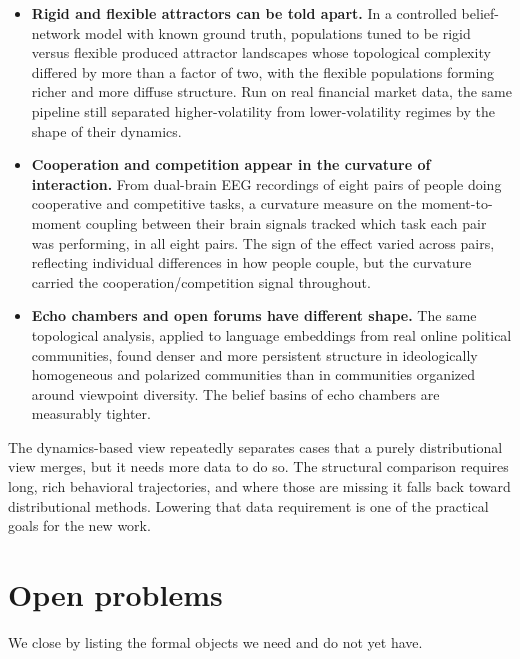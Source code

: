 \documentclass[11pt,a4paper]{article}
\begin{document}
\begin{itemize}[leftmargin=1.4em]
\item \textbf{Rigid and flexible attractors can be told apart.} In a controlled
belief-network model with known ground truth, populations tuned to be rigid
versus flexible produced attractor landscapes whose topological complexity
differed by more than a factor of two, with the flexible populations forming
richer and more diffuse structure. Run on real financial market data, the same
pipeline still separated higher-volatility from lower-volatility regimes by the
shape of their dynamics.

\item \textbf{Cooperation and competition appear in the curvature of
interaction.} From dual-brain EEG recordings of eight pairs of people doing
cooperative and competitive tasks, a curvature measure on the moment-to-moment
coupling between their brain signals tracked which task each pair was
performing, in all eight pairs. The sign of the effect varied across pairs,
reflecting individual differences in how people couple, but the curvature
carried the cooperation/competition signal throughout.

\item \textbf{Echo chambers and open forums have different shape.} The same
topological analysis, applied to language embeddings from real online political
communities, found denser and more persistent structure in ideologically
homogeneous and polarized communities than in communities organized around
viewpoint diversity. The belief basins of echo chambers are measurably tighter.
\end{itemize}

The dynamics-based view repeatedly separates cases that a purely distributional
view merges, but it needs more data to do so. The structural comparison
requires long, rich behavioral trajectories, and where those are missing it
falls back toward distributional methods. Lowering that data requirement is one
of the practical goals for the new work.

\section{Open problems}

We close by listing the formal objects we need and do not yet have.
\end{document}
